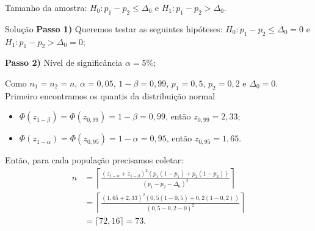 \documentclass[9pt]{beamer}
\begin{document}
\begin{frame}{Tamanho da amostra: $H_0:p_1 - p_2 \leq \Delta_0$ e $H_1: p_1 - p_2 > \Delta_0$.}

\begin{block}{Solução}
	\textbf{Passo 1)} Queremos testar as seguintes hipóteses: $H_0: p_1 - p_2 \leq \Delta_0 = 0$ e $H_1: p_1 - p_2 > \Delta_0 = 0$;
	
	\textbf{Passo 2)} Nível de significância $\alpha=5\%$;
	
	Como $n_1=n_2=n$, $\alpha=0,05$, $1-\beta = 0,99$, $p_1 = 0,5$, $p_2 = 0,2$ e $\Delta_0=0$. Primeiro encontramos os quantis da distribuição normal
	\begin{itemize}
		\item $\Phi\left( z_{1-\beta} \right) = \Phi\left( z_{0,99} \right) = 1-\beta = 0,99$, então $z_{0,99} = 2,33$;
		\item $\Phi\left( z_{1-\alpha} \right) = \Phi\left( z_{0,95} \right) = 1-\alpha = 0,95$, então $z_{0,95} = 1,65$.
	\end{itemize}

	Então, para cada população precisamos coletar:
	\begin{align*}
	n &= \left\lceil \frac{\left(z_{1-\alpha} + z_{1-\beta}  \right)^2 \left( p_1(1 - p_1) + p_2(1 - p_2) \right)}{\left( p_1 -p_2 - \Delta_0 \right)^2} \right\rceil\\
	&= \left\lceil \frac{\left(1,65 + 2,33  \right)^2 \left( 0,5(1 - 0,5) + 0,2(1 - 0,2) \right)}{\left( 0,5 -0,2 - 0 \right)^2} \right\rceil\\
	&= \lceil 72,16  \rceil = 73.
	\end{align*}
	
\end{block}

\end{frame}
\end{document}
